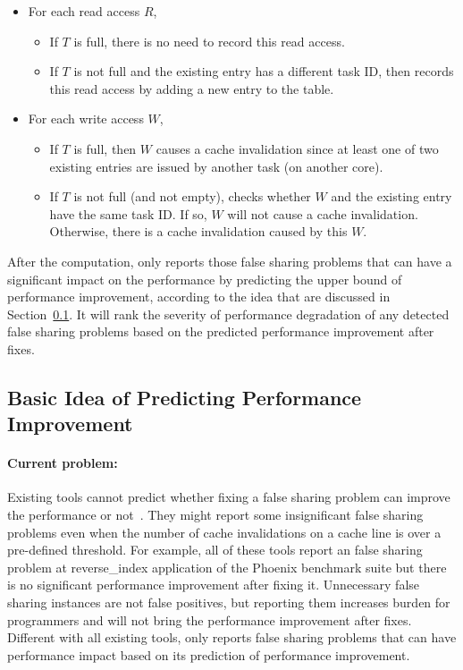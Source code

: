 \begin{itemize}
\item
  For each read access $R$,
  \begin{itemize}
    \item
      If $T$ is full, there is no need to record this read access.
    \item
      If $T$ is not full and the existing entry has a different task ID, 
      then \cheetah{} records this read access by adding a new entry to the table.
  \end{itemize}
\item
  For each write access $W$,  
  \begin{itemize}
    \item
      If $T$ is full, then $W$ causes a cache invalidation since at least one of two existing entries are issued by another task (on another core).
    \item
      If $T$ is not full (and not empty),
      \cheetah{} checks whether $W$ and the existing entry have the same task ID. If
      so, $W$ will not cause a cache invalidation. Otherwise, there is a cache invalidation caused by this $W$.
  \end{itemize}
\end{itemize}

      
After the computation, 
\cheetah{} only reports those false sharing problems that can have a significant impact on the performance by predicting the upper bound of performance improvement, according to the idea that are discussed in Section~\ref{sec:predictimprovement}.  It will rank the severity of performance degradation of any detected false sharing problems based on the predicted performance improvement after fixes.

\subsection{Basic Idea of Predicting Performance Improvement}
\label{sec:predictimprovement}

\paragraph{Current problem:} Existing tools cannot predict whether fixing a false sharing problem can improve the performance or not~\cite{sheriff, Predator, openmp}. They might report some insignificant false sharing problems even when the number of cache invalidations on a cache line is over a pre-defined threshold. For example, all of these tools report an false sharing problem at reverse\_index application of the Phoenix benchmark suite but there is no significant performance improvement after fixing it. Unnecessary false sharing instances are not false positives, but reporting them increases burden for programmers and will not bring the performance improvement after fixes. Different with all existing tools, \Cheetah{} only reports false sharing problems that can have performance impact based on its prediction of performance improvement.  

